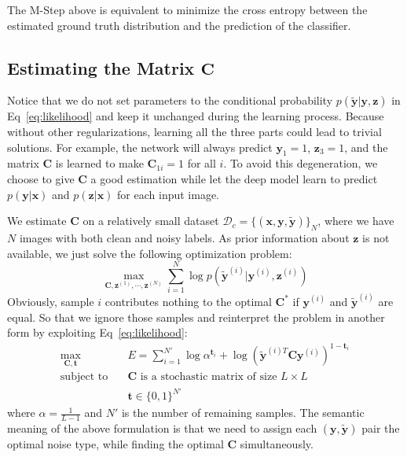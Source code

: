 \documentclass[10pt,twocolumn,letterpaper]{article}
\def\vec{\mathbf}
\def\mat{\mathbf}
\begin{document}
The M-Step above is equivalent to minimize the cross entropy between the estimated ground truth distribution and the prediction of the classifier.

\subsection{Estimating the Matrix $\mat{C}$} %
\label{sub:confusion_estimation}
Notice that we do not set parameters to the conditional probability $p(\tilde{\vec{y}}|\vec{y},\vec{z})$ in Eq~\eqref{eq:likelihood} and keep it unchanged during the learning process. Because without other regularizations, learning all the three parts could lead to trivial solutions. For example, the network will always predict $\vec{y}_1 = 1$, $\vec{z}_3 = 1$, and the matrix $\mat{C}$ is learned to make $\mat{C}_{1i} = 1$ for all $i$. To avoid this degeneration, we choose to give $\mat{C}$ a good estimation while let the deep model learn to predict $p(\vec{y} | \vec{x})$ and $p(\vec{z} | \vec{x})$ for each input image.

We estimate $\mat{C}$ on a relatively small dataset $\mathcal{D}_c = \{(\vec{x},\vec{y},\tilde{\vec{y}})\}_N$, where we have $N$ images with both clean and noisy labels. As prior information about $\vec{z}$ is not available, we just solve the following optimization problem:
\begin{equation} \label{eq:opt_all}
    \max_{\mat{C},\vec{z}^{(1)},\cdots,\vec{z}^{(N)}} \sum_{i=1}^N \log p(\tilde{\vec{y}}^{(i)}|\vec{y}^{(i)},\vec{z}^{(i)})
\end{equation}
Obviously, sample $i$ contributes nothing to the optimal $\mat{C}^*$ if $\vec{y}^{(i)}$ and $\tilde{\vec{y}}^{(i)}$ are equal. So that we ignore those samples and reinterpret the problem in another form by exploiting Eq~\ref{eq:likelihood}:
\begin{equation}
\begin{aligned}
\max_{\mat{C},\vec{t}} \quad & E=\sum_{i=1}^{N'} \log \alpha^{\vec{t}_i} + \log (\tilde{\vec{y}}^{(i)T} \mat{C} \vec{y}^{(i)})^{1-\vec{t}_i}\\
\text{subject to} \quad & \mat{C} \text{ is a stochastic matrix of size } L\times L \\
                    & \vec{t} \in \{0,1\}^{N'}
\end{aligned}
\end{equation}
where $\alpha=\frac{1}{L-1}$ and $N'$ is the number of remaining samples. The semantic meaning of the above formulation is that we need to assign each $(\vec{y},\tilde{\vec{y}})$ pair the optimal noise type, while finding the optimal $\mat{C}$ simultaneously.
\end{document}
